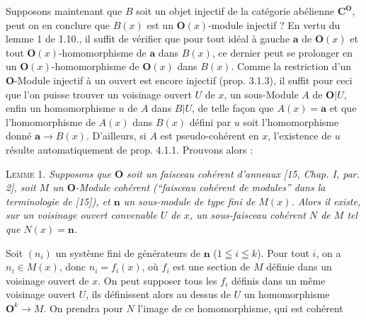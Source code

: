 Supposons maintenant que $B$ soit un objet injectif de la catégorie abélienne
$\mathbf C^{\mathbf O}$, peut on en conclure que $B(x)$ est un ${\mathbf O}(x)$-module injectif ? En vertu
du lemme 1 de 1.10., il suffit de vérifier que pour tout idéal à gauche $\mathbf a$ de
${\mathbf O}(x)$ et tout ${\mathbf O}(x)$-homomorphisme de $\mathbf a$ dans $B(x)$, ce dernier peut se
prolonger en un ${\mathbf O}(x)$-homomorphisme de ${\mathbf O}(x)$ dans $B(x)$. Comme la
restriction d'un ${\mathbf O}$-Module injectif à un ouvert est encore injectif (prop.
3.1.3), il suffit pour ceci que l'on puisse trouver un voisinage ouvert $U$ de
$x$, un sous-Module $A$ de ${\mathbf O}|U$, enfin un homomorphisme $u$ de $A$ dans
$B|U$, de telle façon que $A(x)=\mathbf a$ et que l'homomorphisme de $A(x)$ dans
$B(x)$ défini par $u$ soit l'homomorphisme donné $\mathbf a\to B(x)$.
D'ailleurs, si $A$ est pseudo-cohérent en $x$, l'existence de $u$ résulte
automatiquement de prop. 4.1.1. Prouvons alors :

\textsc{Lemme 1.} \textit{Supposons que ${\mathbf O}$ soit un faisceau cohérent
d'anneaux \textup{[15, Chap. I, par. 2]}, soit $M$ un ${\mathbf O}$-Module cohérent \textup{(}``faisceau
cohérent de modules'' dans la terminologie de \textup{[15])}, et $\mathbf n$ un sous-module de
type fini de $M(x)$. Alors il existe, sur un voisinage ouvert convenable $U$ de
$x$, un sous-faisceau cohérent $N$ de $M$ tel que $N(x)=\mathbf n$.}

Soit $(n_i)$ un système fini de générateurs de $\mathbf n$ ($1\leqq i\leqq k$). Pour
tout $i$, on a $n_i\in M(x)$, donc $n_i=f_i(x)$, où $f_i$ est une section de
$M$ définie dans un voisinage ouvert de $x$. On peut supposer tous les $f_i$
définis dans un même voisinage ouvert $U$, ils définissent alors au dessus de
$U$ un homomorphisme ${\mathbf O}^k\to M$. On prendra pour $N$ l'image de
ce homomorphisme, qui est cohérent

